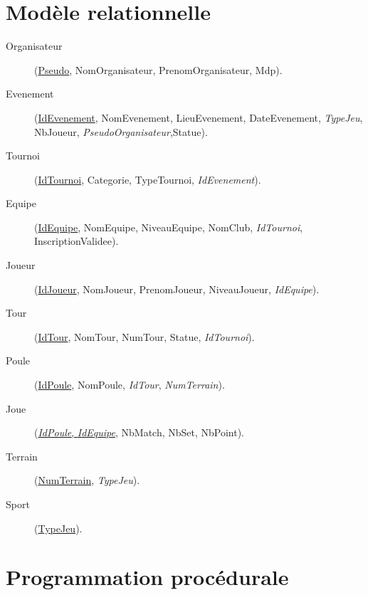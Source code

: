 \documentclass[a4paper,12pt]{report}   %
\begin{document}
\chapter*{Modèle relationnelle}

\vspace{.5cm}

\begin{flushleft}
\begin{description}

\item[Organisateur](\underline{Pseudo}, NomOrganisateur, PrenomOrganisateur, Mdp).
\vspace{.3cm}
\item[Evenement](\underline{IdEvenement}, NomEvenement, LieuEvenement, DateEvenement, \textit{TypeJeu}, NbJoueur, \textit{PseudoOrganisateur},Statue).
\vspace{.3cm}
\item[Tournoi] (\underline{IdTournoi}, Categorie, TypeTournoi, \textit{IdEvenement}).
\vspace{.3cm}
\item[Equipe] (\underline{IdEquipe}, NomEquipe, NiveauEquipe, NomClub, \textit{IdTournoi}, InscriptionValidee).
\vspace{.3cm}
\item[Joueur] (\underline{IdJoueur}, NomJoueur, PrenomJoueur, NiveauJoueur, \textit{IdEquipe}).\\
\vspace{.3cm}
\item[Tour] (\underline{IdTour}, NomTour, NumTour, Statue, \textit{IdTournoi}).
\vspace{.3cm}
\item[Poule] (\underline{IdPoule}, NomPoule, \textit{IdTour}, \textit{NumTerrain}).
\vspace{.3cm}
\item[Joue] (\underline{\textit{IdPoule}, \textit{IdEquipe}}, NbMatch, NbSet, NbPoint).
\vspace{.3cm}
\item[Terrain] (\underline{NumTerrain}, \textit{TypeJeu}).
\vspace{.3cm}
\item[Sport] (\underline{TypeJeu}).


\end{description}
\end{flushleft}


\chapter*{Programmation procédurale}
\end{document}
